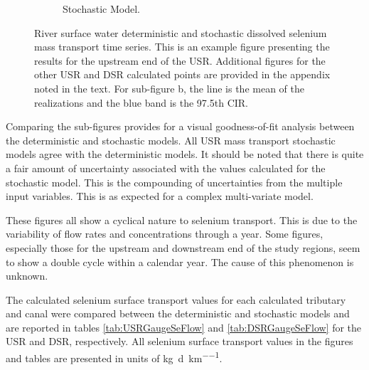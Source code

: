 \begin{linenumbers}
\begin{figure}[htbp]
\begin{subfigure}{0.5\textwidth}
		\caption{Stochastic Model.}
		\label{sub:ExampleSSeFlux}
	\end{subfigure}
	\caption[River surface water deterministic and stochastic dissolved selenium mass transport time series.]{River surface water deterministic and stochastic dissolved selenium mass transport time series.  This is an example figure presenting the results for the upstream end of the USR.  Additional figures for the other USR and DSR calculated points are provided in the appendix noted in the text.  For sub-figure b, the line is the mean of the realizations and the blue band is the 97.5th CIR.}
	\label{fig:ExampleSeFlux}
\end{figure}

Comparing the sub-figures provides for a visual goodness-of-fit analysis between the deterministic and stochastic models.  All USR mass transport stochastic models agree with the deterministic models.  It should be noted that there is quite a fair amount of uncertainty associated with the values calculated for the stochastic model.  This is the compounding of uncertainties from the multiple input variables.  This is as expected for a complex multi-variate model.

These figures all show a cyclical nature to selenium transport.  This is due to the variability of flow rates and concentrations through a year.  Some figures, especially those for the upstream and downstream end of the study regions, seem to show a double cycle within a calendar year.  The cause of this phenomenon is unknown.

The calculated selenium surface transport values for each calculated tributary and canal were compared between the deterministic and stochastic models and are reported in tables \ref{tab:USRGaugeSeFlow} and \ref{tab:DSRGaugeSeFlow} for the USR and DSR, respectively.  All selenium surface transport values in the figures and tables are presented in units of \si{\kilo\gram\per\day\per\kilo\meter}. 


\end{linenumbers}
